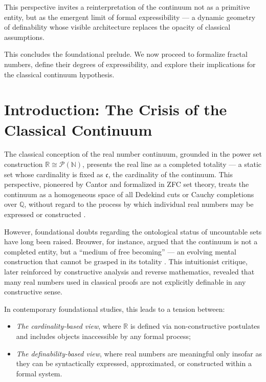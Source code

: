\documentclass[12pt]{article}
\theoremstyle{definition}
\theoremstyle{plain}
\theoremstyle{remark}
\begin{document}
\vspace{0.5em}

\noindent This perspective invites a reinterpretation of the continuum not as a primitive entity, but as the emergent limit of formal expressibility — a dynamic geometry of definability whose visible architecture replaces the opacity of classical assumptions.

This concludes the foundational prelude. We now proceed to formalize fractal numbers, define their degrees of expressibility, and explore their implications for the classical continuum hypothesis.

\section{Introduction: The Crisis of the Classical Continuum}

The classical conception of the real number continuum, grounded in the power set construction \( \mathbb{R} \cong \mathcal{P}(\mathbb{N}) \), presents the real line as a completed totality — a static set whose cardinality is fixed as \( \mathfrak{c} \), the cardinality of the continuum. This perspective, pioneered by Cantor and formalized in ZFC set theory, treats the continuum as a homogeneous space of all Dedekind cuts or Cauchy completions over \( \mathbb{Q} \), without regard to the process by which individual real numbers may be expressed or constructed \cite{cantor1874ueber, dedekind1963stetigkeit}.

However, foundational doubts regarding the ontological status of uncountable sets have long been raised. Brouwer, for instance, argued that the continuum is not a completed entity, but a ``medium of free becoming'' — an evolving mental construction that cannot be grasped in its totality \cite{brouwer1907}. This intuitionist critique, later reinforced by constructive analysis and reverse mathematics, revealed that many real numbers used in classical proofs are not explicitly definable in any constructive sense.

In contemporary foundational studies, this leads to a tension between:
\begin{itemize}
    \item \emph{The cardinality-based view}, where \( \mathbb{R} \) is defined via non-constructive postulates and includes objects inaccessible by any formal process;
    \item \emph{The definability-based view}, where real numbers are meaningful only insofar as they can be syntactically expressed, approximated, or constructed within a formal system.
\end{itemize}
\end{document}
